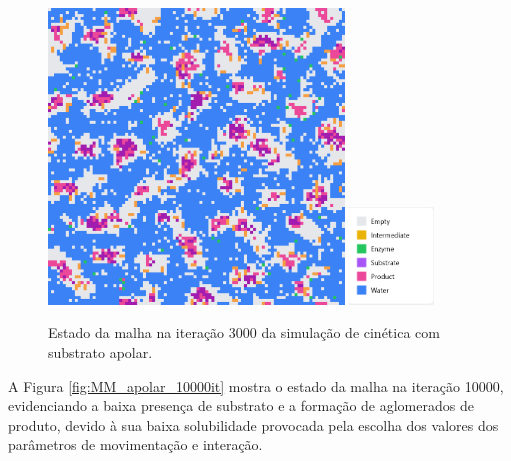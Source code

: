\documentclass[12pt,oneside]{report}
\begin{document}
\begin{figure}[H]
    \centering
    \includegraphics[width=0.7\textwidth]{img/apolar_3000.png}
    \hspace{0.05\textwidth}
    \includegraphics[width=0.2\textwidth]{img/legend.png}
    \caption{\small Estado da malha na iteração 3000 da simulação de cinética com substrato apolar.}
    \label{fig:MM_apolar_3000it}
\end{figure}

A Figura \ref{fig:MM_apolar_10000it} mostra o estado da malha na iteração 10000, evidenciando a baixa presença de substrato e a formação de aglomerados de produto, devido à sua baixa solubilidade provocada pela escolha dos valores dos parâmetros de movimentação e interação.
\end{document}
